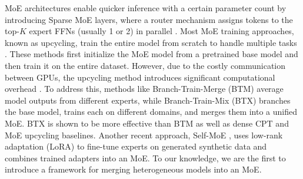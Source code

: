 MoE architectures enable quicker inference with a certain parameter count by introducing Sparse MoE layers, where a router mechanism assigns tokens to the top-$K$ expert FFNs (usually 1 or 2) in parallel \cite{fedus2022switch, shazeer2017outrageously, zhang2022mixtureattentionheadsselecting}. Most MoE training approaches, known as upcycling, train the entire model from scratch to handle multiple tasks \cite{komatsuzaki2022sparse, jiang2024mixtral, dou2024loramoe, dai2024deepseekmoe}. These methods first initialize the MoE model from a pretrained base model and then train it on the entire dataset. However, due to the costly communication between GPUs, the upcycling method introduces significant computational overhead \cite{sukhbaatar2024branchtrainmixmixingexpertllms, li-etal-2024-pedants}. To address this, methods like Branch-Train-Merge (BTM) \cite{gururangan2023scaling, li2022branch} average model outputs from different experts, while Branch-Train-Mix (BTX) \cite{sukhbaatar2024branchtrainmixmixingexpertllms} branches the base model, trains each on different domains, and merges them into a unified MoE. 
BTX is shown to be more effective than BTM as well as dense CPT and MoE upcycling baselines.
Another recent approach, Self-MoE \cite{kang2024self}, uses low-rank adaptation (LoRA) \cite{hu2021lora} to fine-tune experts on generated synthetic data \cite{liu2024csrec} and combines trained adapters into an MoE.
To our knowledge, we are the first to introduce a framework for merging heterogeneous models into an MoE.